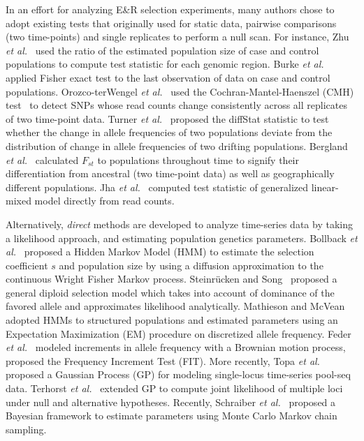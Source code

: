 In an effort for analyzing E\&R selection experiments, many authors
chose to adopt existing tests that originally used for static data, pairwise 
comparisons (two time-points) and single replicates to perform a null scan.
For instance, Zhu
\emph{et al.}~\cite{zhou2011experimental} used the ratio of the
estimated population size of case and control populations to compute
test statistic for each genomic region. Burke \emph{et
  al.}~\cite{burke2010genome} applied Fisher exact test to the last
observation of data on case and control populations.  Orozco-terWengel \emph{et
  al.}~\cite{orozco2012adaptation} used the Cochran-Mantel-Haenszel
(CMH) test~\cite{agresti2011categorical} to detect SNPs whose read
counts change consistently across all replicates of two time-point
data. Turner \emph{et al.}~\cite{turner2011population} proposed the
diffStat statistic to test whether the change in allele frequencies of
two populations deviate from the distribution of change in allele
frequencies of two drifting populations. Bergland \emph{et
  al.}~\cite{bergland2014genomic} calculated $F_{st}$ to populations
throughout time to signify their differentiation from ancestral (two
time-point data) as well as geographically different populations. Jha
\emph{et al.}~\cite{jha2015whole} computed test statistic of
generalized linear-mixed model directly from read counts.



Alternatively, \emph{direct} methods are developed to analyze 
time-series 
data by taking a likelihood approach, and estimating population genetics 
parameters.
Bollback \emph{et al.}~\cite{bollback2008estimation} proposed a Hidden 
Markov Model (HMM) to     
estimate
the selection coefficient $s$ and population size by using a diffusion
approximation to the continuous Wright Fisher Markov process.  
Steinr\"{u}cken and
Song~\cite{steinrucken2014novel} proposed a general diploid selection
model which takes into account of dominance of the favored allele and
approximates likelihood analytically.  Mathieson and
McVean~\cite{mathieson2013estimating} adopted HMMs to structured
populations and estimated parameters using an Expectation Maximization
(EM) procedure on discretized allele frequency.  Feder \emph{et
  al.}~\cite{feder2014Identifying} modeled increments in allele
frequency with a Brownian motion process, proposed the Frequency
Increment Test (FIT). More recently, Topa \emph{et
  al.}~\cite{topa2015gaussian} proposed a Gaussian Process (GP) for
modeling single-locus time-series pool-seq data. Terhorst \emph{et
  al.}~\cite{Terhorst2015Multi} extended GP to compute joint
likelihood of multiple loci under null and alternative hypotheses.
Recently, Schraiber \emph{et al.}~\cite{schraiber2016bayesian}
proposed a Bayesian framework to estimate parameters using Monte Carlo
Markov chain sampling.


